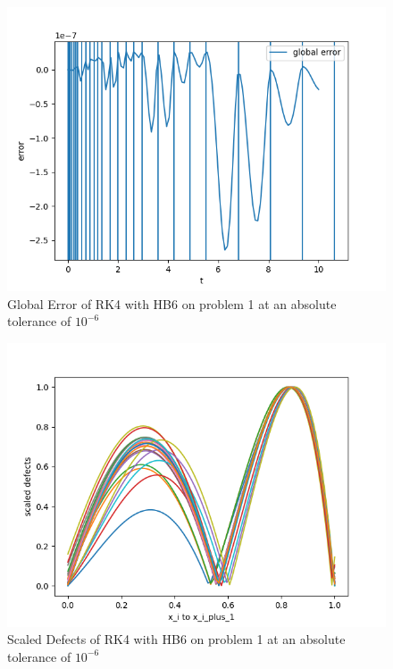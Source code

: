 \documentclass{article}
\begin{document}
\begin{figure}[H]
\centering
\includegraphics[width=0.7\linewidth]{./figures/rk4_with_hb6_p1_global_error}
\caption{Global Error of RK4 with HB6 on problem 1 at an absolute tolerance of $10^{-6}$}
\label{fig:rk4_with_hb6_p1_global_error}
\end{figure}

\begin{figure}[H]
\centering
\includegraphics[width=0.7\linewidth]{./figures/rk4_with_hb6_p1_scaled_defects}
\caption{Scaled Defects of RK4 with HB6 on problem 1 at an absolute tolerance of $10^{-6}$}
\label{fig:rk4_with_hb6_p1_scaled_defects}
\end{figure}
\end{document}
